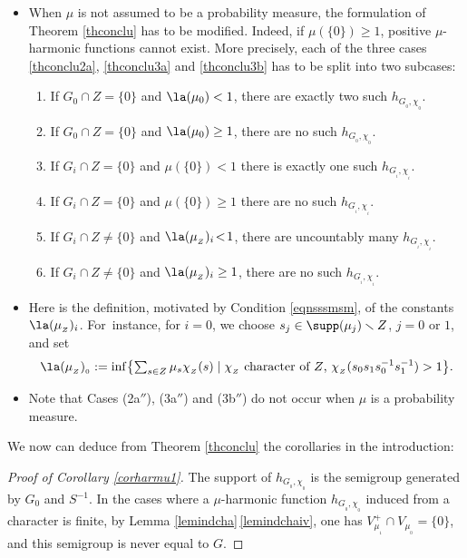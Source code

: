\enlargethispage{-\baselineskip}%
\pagebreak[2]
\skpt
\begin{Rem}
\label{remconclu}
\begin{itemize}
\item
When $\mu$ is not assumed to be a probability measure,
the formulation of Theorem \ref{thconclu} has to be modified.
Indeed, if $\mu (\{ 0\})\geq 1$,
positive $\mu$-harmonic functions cannot exist.
More precisely, each of the three cases \eqref{thconclu2a}, \eqref{thconclu3a} and \eqref{thconclu3b}
has to be split into two subcases:
\begin{enumerate}
\item[(2a$'$)] If $G_0\cap Z = \{ 0\}$ and $\la(\mu_0)< 1$,
there are exactly two such $h_{G_{_0},\chi_{_0}}$. 
\item[(2a$''$)] If $G_0\cap Z = \{ 0\}$ and $\la(\mu_0)\geq 1$,
there are no such $h_{G_{_0},\chi_{_0}}$.
\item[(3a$'$)] If $G_i\cap Z = \{ 0\}$ and $\mu(\{ 0\})< 1$
there is exactly one such $h_{G_{_i},\chi_{_i}}$.
\item[(3a$''$)] If $G_i\cap Z = \{ 0\}$ and $\mu(\{ 0\})\geq 1$
there are no such $h_{G_{_i},\chi_{_i}}$.
\item[(3b$'$)] If $G_i\cap Z\neq \{ 0\}$
and
$\la(\mu_{_Z})_i\!<\! 1$,\!
there are uncountably many $h_{G_{_i},\chi_{_i}}$.
\item[(3b$''$)] If $G_i\cap Z \neq \{ 0\}$ and
$\la(\mu_{_Z})_i\geq 1$,
there are no such $h_{G_{_i},\chi_{_i}}$.
\end{enumerate}
\item
Here is the definition,
motivated by Condition \eqref{eqnsssmsm}, of the constants $\la(\mu_{_Z})_i$.
For~instance, for $i=0$, we choose $s_j\in \supp(\mu_j)\smallsetminus Z$,
$j=0$ or $1$,
and set\vspace*{-3pt}\enlargethispage{.5\baselineskip}%
\[\textstyle
\la(\mu_{_Z})_{_0}:=\inf\bigl\{\sum_{s\in Z}\mu_s\chi_{_Z}(s)\mid \chi_{_Z}
\text{ character of $Z$, $\chi_{_Z}(s_0s_1s_0^{-1}s_1^{-1})>1$}\bigr\}.
\]
\item
Note that Cases (2a$''$), (3a$''$) and (3b$''$) do not occur
when $\mu$ is a probability measure.
\end{itemize}
\end{Rem}

We now can deduce from Theorem \ref{thconclu} the corollaries in the
introduction:

\begin{proof}[Proof of Corollary \ref{corharmu1}]
The support of $h_{G_{_0},\chi_{_0}}$
is the semigroup generated by $G_0$ and $S^{-1}$.
In the cases where a $\mu$-harmonic function
$h_{G_{_0},\chi_{_0}}$ induced from a character is finite,
by Lemma \ref{lemindcha}\,\eqref{lemindchaiv}, one has $V^+_{\mu_{_1}}\cap V_{\mu_{_0}}=\{0\}$,
and this semigroup is never equal to $G$.
\end{proof}

